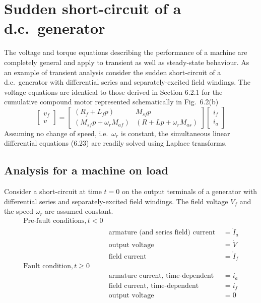 \documentclass[a4paper,numbers=noenddot,12pt]{scrbook}
\begin{document}
\section{Sudden short-circuit of a d.c.\ generator}
The voltage and torque equations describing the performance of a machine are completely general and apply to transient as well as steady-state behaviour. As an example of transient analysis consider the sudden short-circuit of a d.c.\ generator with differential series and separately-excited field windings. The voltage equations are identical to those derived in Section 6.2.1 for the cumulative compound motor represented schematically in Fig.\ 6.2(b)
\begin{equation}
    \begin{bmatrix}
        v_f \\[2ex] v
    \end{bmatrix} =
    \begin{bmatrix}
        (R_f + L_f p) & M_{sf} p \\[2ex]
        (M_{sf} p + \omega_r M_{af}) & (R + L p + \omega_r M_{as})
    \end{bmatrix}
    \begin{bmatrix}
        i_f \\[2ex] i_a
    \end{bmatrix}
    \label{}
\end{equation}
Assuming no change of speed, i.e.\ $\omega_r$ is constant, the simultaneous linear differential equations (6.23) are readily solved using Laplace transforms.

\subsection{Analysis for a machine on load}
Consider a short-circuit at time $t=0$ on the output terminals of a generator with differential series and separately-excited field windings. The field voltage $V_f$ and the speed $\omega_r$ are assumed constant.
\begin{align*}
    \text{Pre-fault conditions}, t < 0\\
    & \text{armature (and series field) current } &= \mathring{I}_a\\
    & \text{output voltage} & = \mathring{V}\\
    & \text{field current} & = \mathring{I}_f\\
    \text{Fault condition}, t \geq 0 \\
    & \text{armature current, time-dependent} & = i_a\\
    & \text{field current, time-dependent} & = i_f \\
    & \text{output voltage} & = 0
\end{align*}
\end{document}
